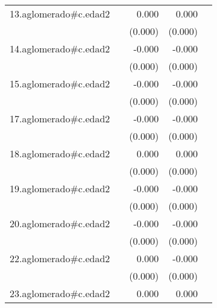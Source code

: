 {\begin{longtable}{l*{4}{D{.}{.}{-1}}}
\addlinespace
13.aglomerado#c.edad2&                     &       0.000\sym{*}  &       0.000         &                     \\
            &                     &     (0.000)         &     (0.000)         &                     \\
\addlinespace
14.aglomerado#c.edad2&                     &      -0.000         &      -0.000\sym{*}  &                     \\
            &                     &     (0.000)         &     (0.000)         &                     \\
\addlinespace
15.aglomerado#c.edad2&                     &      -0.000         &      -0.000\sym{*}  &                     \\
            &                     &     (0.000)         &     (0.000)         &                     \\
\addlinespace
17.aglomerado#c.edad2&                     &      -0.000         &      -0.000         &                     \\
            &                     &     (0.000)         &     (0.000)         &                     \\
\addlinespace
18.aglomerado#c.edad2&                     &       0.000         &       0.000         &                     \\
            &                     &     (0.000)         &     (0.000)         &                     \\
\addlinespace
19.aglomerado#c.edad2&                     &      -0.000         &      -0.000\sym{*}  &                     \\
            &                     &     (0.000)         &     (0.000)         &                     \\
\addlinespace
20.aglomerado#c.edad2&                     &      -0.000         &      -0.000\sym{*}  &                     \\
            &                     &     (0.000)         &     (0.000)         &                     \\
\addlinespace
22.aglomerado#c.edad2&                     &       0.000         &      -0.000         &                     \\
            &                     &     (0.000)         &     (0.000)         &                     \\
\addlinespace
23.aglomerado#c.edad2&                     &       0.000         &       0.000         &                     \\

\end{longtable}}
